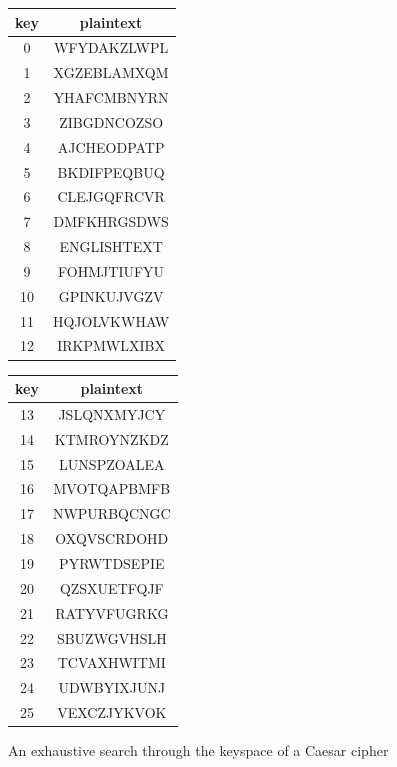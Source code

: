 \documentclass{article}
\theoremstyle{plain}
\theoremstyle{definition}
\theoremstyle{remark}
\numberwithin{theorem}{section}
\newcommand{\bespokedemo}[1]{\href{bespoke:#1}{\textsf{[\,interactive: #1\,]}}}
\newif\ifweb \webfalse
\DeclareRobustCommand{\webonly}[1]{\ifweb#1\fi}
\DeclareRobustCommand{\printonly}[1]{\ifweb\else#1\fi}
\begin{document}
\begin{figure}
	\begin{center}
\printonly{%
	 \begin{minipage}{0.45\textwidth}
		 \begin{center}
     \begin{tabular}{c|c}
	     key & plaintext \\
       \hline
 0 & WFYDAKZLWPL \\
 1 & XGZEBLAMXQM \\
 2 & YHAFCMBNYRN \\
 3 & ZIBGDNCOZSO \\
 4 & AJCHEODPATP \\
 5 & BKDIFPEQBUQ \\
 6 & CLEJGQFRCVR \\
 7 & DMFKHRGSDWS \\
 8 & ENGLISHTEXT \\
 9 & FOHMJTIUFYU \\
10 & GPINKUJVGZV \\
11 & HQJOLVKWHAW \\
12 & IRKPMWLXIBX \\
      \end{tabular}
      \end{center}
      \end{minipage}
      \begin{minipage}{0.45\textwidth}
	      \begin{center}
     \begin{tabular}{c|c}
	     key & plaintext \\
       \hline
13 & JSLQNXMYJCY \\
14 & KTMROYNZKDZ \\
15 & LUNSPZOALEA \\
16 & MVOTQAPBMFB \\
17 & NWPURBQCNGC \\
18 & OXQVSCRDOHD \\
19 & PYRWTDSEPIE \\
20 & QZSXUETFQJF \\
21 & RATYVFUGRKG \\
22 & SBUZWGVHSLH \\
23 & TCVAXHWITMI \\
24 & UDWBYIXJUNJ \\
25 & VEXCZJYKVOK \\
      \end{tabular}
\end{center}
      \end{minipage}
}%
\webonly{\bespokedemo{caesar-crack-demo}}
\end{center}
\caption{An exhaustive search through the keyspace of a Caesar cipher\webonly{.  Hover the rows --- exactly one shift reads as English}}
\label{fig:caesar-exhaustive}
\end{figure}
\end{document}
